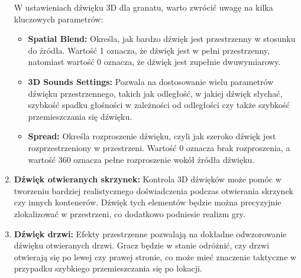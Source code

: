 \begin{enumerate}
    \FloatBarrier
    W ustawieniach dźwięku 3D dla granatu, warto zwrócić uwagę na kilka kluczowych parametrów:
        \begin{itemize}
        \item \textbf{Spatial Blend:} Określa, jak bardzo dźwięk jest przestrzenny w stosunku do źródła. Wartość 1 oznacza, że dźwięk jest w pełni przestrzenny, natomiast wartość 0 oznacza, że dźwięk jest zupełnie dwuwymiarowy.
        \item \textbf{3D Sounds Settings:} Pozwala na dostosowanie wielu parametrów dźwięku przestrzennego, takich jak odległość, w jakiej dźwięk słychać, szybkość spadku głośności w zależności od odległości czy także szybkość przemieszczania się dźwięku.
        \item \textbf{Spread:} Określa rozproszenie dźwięku, czyli jak szeroko dźwięk jest rozprzestrzeniony w przestrzeni. Wartość 0 oznacza brak rozproszenia, a wartość 360 oznacza pełne rozproszenie wokół źródła dźwięku.
        \end{itemize}
    \item \textbf{Dźwięk otwieranych skrzynek:} Kontrola 3D dźwięków może pomóc w tworzeniu bardziej realistycznego doświadczenia podczas otwierania skrzynek czy innych kontenerów. Dźwięk tych elementów będzie można precyzyjnie zlokalizować w przestrzeni, co dodatkowo podniesie realizm gry.
    \item \textbf{Dźwięk drzwi:} Efekty przestrzenne pozwalają na dokładne odwzorowanie dźwięku otwieranych drzwi. Gracz będzie w stanie odróżnić, czy drzwi otwierają się po lewej czy prawej stronie, co może mieć znaczenie taktyczne w przypadku szybkiego przemieszczania się po lokacji.
\end{enumerate}